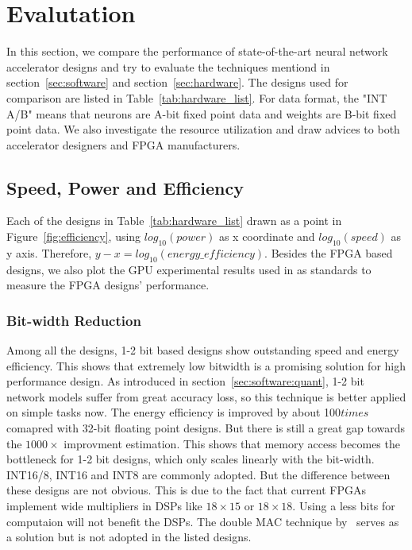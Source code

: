 \section{Evalutation}\label{sec:evaluation}

In this section, we compare the performance of state-of-the-art neural network accelerator designs and try to evaluate the techniques mentiond in section~\ref{sec:software} and section~\ref{sec:hardware}. The designs used for comparison are listed in Table~\ref{tab:hardware_list}. For data format, the "INT A/B" means that neurons are A-bit fixed point data and weights are B-bit fixed point data. We also investigate the resource utilization and draw advices to both accelerator designers and FPGA manufacturers.



\subsection{Speed, Power and Efficiency}

Each of the designs in Table~\ref{tab:hardware_list} drawn as a point in Figure~\ref{fig:efficiency}, using $log_{10}(power)$ as x coordinate and $log_{10}(speed)$ as y axis. Therefore, $y-x=log_{10}(energy\_efficiency)$. Besides the FPGA based designs, we also plot the GPU experimental results used in \cite{guo2017angel, han2017ese} as standards to measure the FPGA designs' performance.

\subsubsection{Bit-width Reduction} Among all the designs, 1-2 bit based designs show outstanding speed and energy efficiency. This shows that extremely low bitwidth is a promising solution for high performance design. As introduced in section~\ref{sec:software:quant}, 1-2 bit network models suffer from great accuracy loss, so this technique is better applied on simple tasks now. The energy efficiency is improved by about 100$times$ comapred with 32-bit floating point designs. But there is still a great gap towards the $1000\times$ improvment estimation. This shows that memory access becomes the bottleneck for 1-2 bit designs, which only scales linearly with the bit-width. INT16/8, INT16 and INT8 are commonly adopted. But the difference between these designs are not obvious. This is due to the fact that current FPGAs implement wide multipliers in DSPs like $18\times 15$ or $18\times 18$. Using a less bits for computaion will not benefit the DSPs. The double MAC technique by~\cite{nguyen2017double} serves as a solution but is not adopted in the listed designs.



